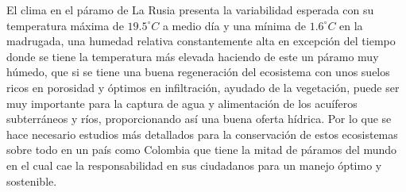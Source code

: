 \documentclass[conference,final,]{IEEEtran}
\begin{document}
El clima en el páramo de La Rusia presenta la variabilidad esperada con
su temperatura máxima de \(19.5^{\circ}C\) a medio día y una mínima de
\(1.6^{\circ}C\) en la madrugada, una humedad relativa constantemente
alta en excepción del tiempo donde se tiene la temperatura más elevada
haciendo de este un páramo muy húmedo, que si se tiene una buena
regeneración del ecosistema con unos suelos ricos en porosidad y óptimos
en infiltración, ayudado de la vegetación, puede ser muy importante para
la captura de agua y alimentación de los acuíferos subterráneos y ríos,
proporcionando así una buena oferta hídrica. Por lo que se hace
necesario estudios más detallados para la conservación de estos
ecosistemas sobre todo en un país como Colombia que tiene la mitad de
páramos del mundo en el cual cae la responsabilidad en sus ciudadanos
para un manejo óptimo y sostenible.


\end{document}
